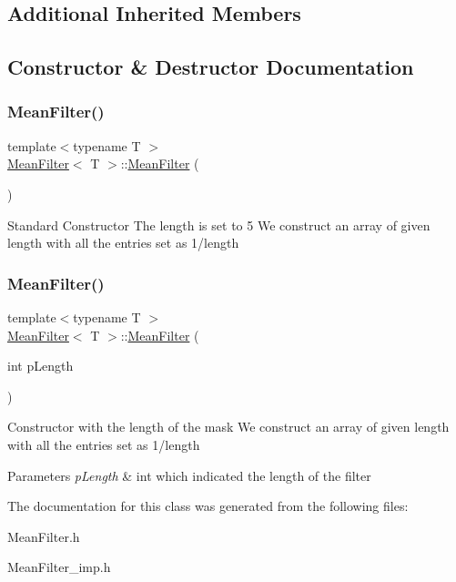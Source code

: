\subsection*{Additional Inherited Members}


\subsection{Constructor \& Destructor Documentation}
\mbox{\label{class_mean_filter_a413efd370b9feb8bb7bef736c83356ec}} 
\subsubsection{\texorpdfstring{Mean\+Filter()}{MeanFilter()}\hspace{0.1cm}{\footnotesize\ttfamily [1/2]}}
{\footnotesize\ttfamily template$<$typename T $>$ \\
\hyperlink{class_mean_filter}{Mean\+Filter}$<$ T $>$\+::\hyperlink{class_mean_filter}{Mean\+Filter} (\begin{DoxyParamCaption}{ }\end{DoxyParamCaption})}

Standard Constructor The length is set to 5 We construct an array of given length with all the entries set as 1/length \mbox{\label{class_mean_filter_a6266059422f16d94fbd2661cb05ffade}} 
\subsubsection{\texorpdfstring{Mean\+Filter()}{MeanFilter()}\hspace{0.1cm}{\footnotesize\ttfamily [2/2]}}
{\footnotesize\ttfamily template$<$typename T $>$ \\
\hyperlink{class_mean_filter}{Mean\+Filter}$<$ T $>$\+::\hyperlink{class_mean_filter}{Mean\+Filter} (\begin{DoxyParamCaption}\item[{int}]{p\+Length }\end{DoxyParamCaption})}

Constructor with the length of the mask We construct an array of given length with all the entries set as 1/length 
\begin{DoxyParams}{Parameters}
{\em p\+Length} & int which indicated the length of the filter \\
\hline
\end{DoxyParams}


The documentation for this class was generated from the following files\+:\begin{DoxyCompactItemize}
\item 
Mean\+Filter.\+h\item 
Mean\+Filter\+\_\+imp.\+h\end{DoxyCompactItemize}
